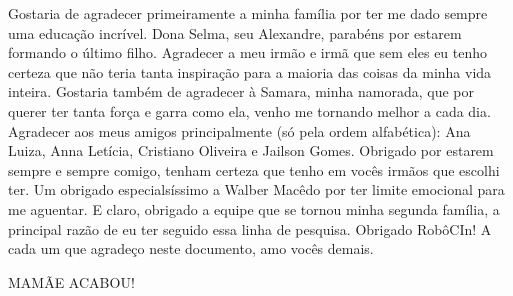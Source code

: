 Gostaria de agradecer primeiramente a minha família por ter me dado sempre uma educação incrível. Dona Selma, seu Alexandre, parabéns por estarem formando o último filho. Agradecer a meu irmão e irmã que sem eles eu tenho certeza que não teria tanta inspiração para a maioria das coisas da minha vida inteira. Gostaria também de agradecer à Samara, minha namorada, que por querer ter tanta força e garra como ela, venho me tornando melhor a cada dia. Agradecer aos meus amigos principalmente (só pela ordem alfabética): Ana Luiza, Anna Letícia, Cristiano Oliveira e Jailson Gomes. Obrigado por estarem sempre e sempre comigo, tenham certeza que tenho em vocês irmãos que escolhi ter. Um obrigado especialsíssimo a Walber Macêdo por ter limite emocional para me aguentar.
E claro, obrigado a equipe que se tornou minha segunda família, a principal razão de eu ter seguido essa linha de pesquisa. Obrigado RobôCIn! A cada um que agradeço neste documento, amo vocês demais.


\begin{center}
MAMÃE ACABOU!
\end{center}
